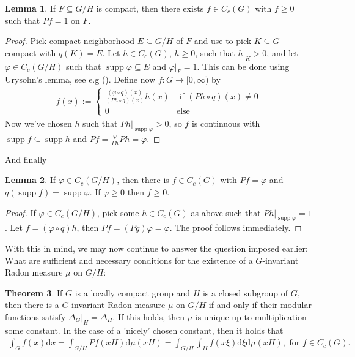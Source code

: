 \documentclass[10pt,twoside,openany,final]{memoir}
\theoremstyle{definition}
\newtheorem{theorem}{Theorem}[chapter]
\newtheorem{lemma}[theorem]{Lemma}
\theoremstyle{Break}
\DeclareMathOperator{\supp}{supp}
\renewcommand{\d}{\mathrm{d}}
\begin{document}
\begin{lemma}
	If $F \subseteq G/H$ is compact, then there exists $f \in C_c(G)$ with $f \geq 0$ such that $Pf=1$ on $F$.
	\label{2.47}
\end{lemma}
\begin{proof}
	Pick compact neighborhood $E \subseteq G/H$ of $F$ and use  to pick $K \subseteq G$ compact with $q(K)=E$. Let $h \in C_c(G)$, $h \geq 0$, such that $h|_K>0$, and let $\varphi \in C_c(G/H)$ such that $\supp \varphi \subseteq E$ and $\varphi|_F=1$. This can be done using Urysohn's lemma, see e.g (\cite[131]{folland2013real}). Define now $f \colon G \to [0,\infty)$ by
		\begin{align*}
			f(x):=
			\begin{cases}
				\frac{(\varphi \circ q)(x)}{(Ph\circ q)(x)} h(x) &\text{ if } (Ph \circ q)(x) \neq 0\\
				0 & \text{else}
			\end{cases}
		\end{align*}
		Now we've chosen $h$ such that $Ph|_{\supp \varphi}>0$, so $f$ is continuous with $\supp f \subseteq \supp h$ and $Pf=\frac{\varphi}{Ph}Ph= \varphi$.
\end{proof}
And finally
\begin{lemma}
	If $\varphi \in C_c(G/H)$, then there is $f \in C_c(G)$ with $Pf=\varphi$ and $q(\supp f) = \supp \varphi$. If $\varphi\geq 0$ then $f \geq 0$.
	\label{liftGH}
\end{lemma}
\begin{proof}
	If $\varphi \in C_c(G/H)$, pick some $h \in C_c(G)$ as above such that $Ph|_{\supp \varphi}=1$. Let $f = (\varphi \circ q)h$, then $Pf = (Pg) \varphi=\varphi$. The proof follows immediately.
\end{proof}
With this in mind, we may now continue to answer the question imposed earlier: What are sufficient and necessary conditions for the existence of a $G$-invariant Radon measure $\mu$ on $G/H$:
\begin{theorem}
	If $G$ is a locally compact group and $H$ is a closed subgroup of $G$, then there is a $G$-invariant Radon measure $\mu$ on $G/H$ if and only if their modular functions satisfy $\Delta_G|_H=\Delta_H$. If this holds, then $\mu$ is unique up to multiplication some constant. In the case of a 'nicely' chosen constant, then it holds that
	\begin{align*}
		\int_G f(x) \d x = \int_{G/H}Pf(xH) \d \mu(xH)=\int_{G/H} \int_H f(x \xi) \d \xi \d \mu(xH), \text{ for } f \in C_c(G).
	\end{align*}
	\label{GH_inv_Radon}
\end{theorem}
\end{document}
